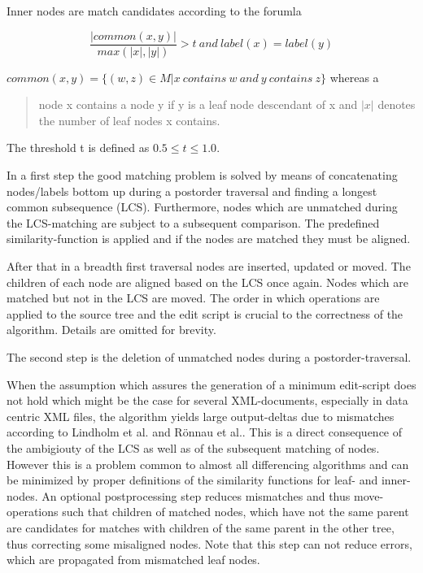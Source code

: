 Inner nodes are match candidates according to the forumla 

\begin{equation}
\frac{|common(x, y)|}{max(|x|,|y|)} > t\ and\ label(x) = label(y)
\end{equation}

$common(x,y) = \{(w,z) \in M | x\ contains\ w\ and\ y\ contains\ z\}$ whereas a \begin{quote}node x contains a node y if y is a leaf node descendant of x and $|x|$ denotes the number of leaf nodes x contains.\end{quote} The threshold t is defined as $0.5 \leq t \leq 1.0$.

In a first step the good matching problem is solved by means of concatenating nodes/labels bottom up during a postorder traversal and finding a longest common subsequence (LCS). Furthermore, nodes which are unmatched during the LCS-matching are subject to a subsequent comparison. The predefined similarity-function is applied and if the nodes are matched they must be aligned. 

After that in a breadth first traversal nodes are inserted, updated or moved. The children of each node are aligned based on the LCS once again. Nodes which are matched but not in the LCS are moved. The order in which operations are applied to the source tree and the edit script is crucial to the correctness of the algorithm. Details are omitted for brevity.

The second step is the deletion of unmatched nodes during a postorder-traversal.

When the assumption which assures the generation of a minimum edit-script does not hold which might be the case for several XML-documents, especially in data centric XML files, the algorithm yields large output-deltas due to mismatches according to Lindholm et al.\cite{lindholm2006fast} and Rönnau et al.\cite{ronnau2009efficient}. This is a direct consequence of the ambigiouty of the LCS as well as of the subsequent matching of nodes. However this is a problem common to almost all differencing algorithms and can be minimized by proper definitions of the similarity functions for leaf- and inner-nodes. An optional postprocessing step reduces mismatches and thus move-operations such that children of matched nodes, which have not the same parent are candidates for matches with children of the same parent in the other tree, thus correcting some misaligned nodes. Note that this step can not reduce errors, which are propagated from mismatched leaf nodes.

